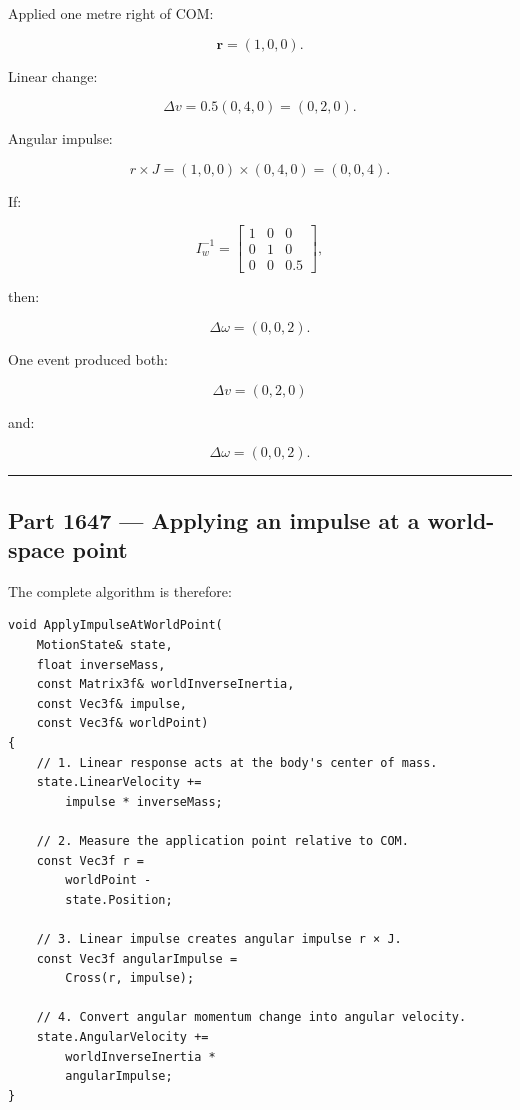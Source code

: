 Applied one metre right of COM:

\[
\mathbf r=(1,0,0).
\]

Linear change:

\[
\Delta v
=
0.5(0,4,0)
=
(0,2,0).
\]

Angular impulse:

\[
r\times J
=
(1,0,0)\times(0,4,0)
=
(0,0,4).
\]

If:

\[
I_w^{-1}
=
\begin{bmatrix}
1&0&0\\
0&1&0\\
0&0&0.5
\end{bmatrix},
\]

then:

\[
\Delta\omega
=
(0,0,2).
\]

One event produced both:

\[
\Delta v=(0,2,0)
\]

and:

\[
\Delta\omega=(0,0,2).
\]

\begin{center}\rule{0.5\linewidth}{0.5pt}\end{center}

\subsection{Part 1647 --- Applying an impulse at a world-space point}\label{06-engine-ii-ch036-part-1647-applying-an-impulse-at-a-world-space-point}

The complete algorithm is therefore:

\begin{verbatim}
void ApplyImpulseAtWorldPoint(
    MotionState& state,
    float inverseMass,
    const Matrix3f& worldInverseInertia,
    const Vec3f& impulse,
    const Vec3f& worldPoint)
{
    // 1. Linear response acts at the body's center of mass.
    state.LinearVelocity +=
        impulse * inverseMass;

    // 2. Measure the application point relative to COM.
    const Vec3f r =
        worldPoint -
        state.Position;

    // 3. Linear impulse creates angular impulse r × J.
    const Vec3f angularImpulse =
        Cross(r, impulse);

    // 4. Convert angular momentum change into angular velocity.
    state.AngularVelocity +=
        worldInverseInertia *
        angularImpulse;
}
\end{verbatim}

